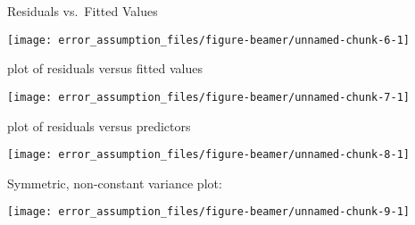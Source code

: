 \begin{frame}[fragile]{Residuals vs.~Fitted Values}
\protect\hypertarget{residuals-vs.-fitted-values}{}
\begin{Shaded}
\begin{Highlighting}[]
 \NormalTok{)}
\end{Highlighting}
\end{Shaded}

\begin{center}\texttt{[image: error\_assumption\_files/figure-beamer/unnamed-chunk-6-1]} \end{center}
\end{frame}

\begin{frame}[fragile]{plot of residuals versus fitted values}
\protect\hypertarget{plot-of-residuals-versus-fitted-values}{}
\begin{Shaded}
\begin{Highlighting}[]
 \NormalTok{)}
\end{Highlighting}
\end{Shaded}

\begin{center}\texttt{[image: error\_assumption\_files/figure-beamer/unnamed-chunk-7-1]} \end{center}
\end{frame}

\begin{frame}[fragile]{plot of residuals versus predictors}
\protect\hypertarget{plot-of-residuals-versus-predictors}{}
\begin{Shaded}
\begin{Highlighting}[]
 \NormalTok{, } \NormalTok{, } \NormalTok{)}
\end{Highlighting}
\end{Shaded}

\begin{center}\texttt{[image: error\_assumption\_files/figure-beamer/unnamed-chunk-8-1]} \end{center}
\end{frame}

\begin{frame}{Symmetric, non-constant variance plot:}
\protect\hypertarget{symmetric-non-constant-variance-plot}{}
\begin{center}\texttt{[image: error\_assumption\_files/figure-beamer/unnamed-chunk-9-1]} \end{center}
\end{frame}

